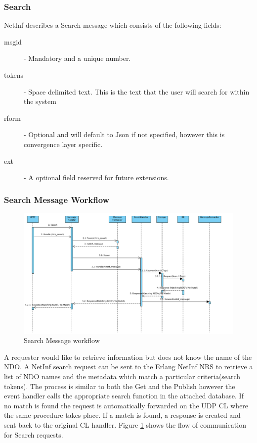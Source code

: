 \subsubsection{Search}

NetInf describes a Search message which consists of the following fields:

\begin{description}
\item[msgid] - Mandatory and a unique number.
\item[tokens] - Space delimited text. This is the text that the user will search for within the system
\item[rform] - Optional and will default to Json if not specified, however this is convergence layer specific.
\item[ext] - A optional field reserved for future extensions.
\end{description}

\subsubsection{Search Message Workflow}

\begin{figure}[H]
	\centering
\centerline{\includegraphics[width=1.2\textwidth]{./img/backend_seq_diagram_SEARCH.png}}
\caption{Search Message workflow}
\label{fig:searchfig}
\end{figure}

A requester would like to retrieve information but does not know the name of the NDO. A NetInf search request can be sent to the Erlang NetInf NRS to retrieve a list of NDO names and the metadata which match a particular criteria(search tokens). The process is similar to both the Get and the Publish however the event handler calls the appropriate search function in the attached database. If no match is found the request is automatically forwarded on the UDP CL where the same procedure takes place. If a match is found, a response is created  and sent back to the original CL handler. Figure \ref{fig:searchfig} shows the flow of communication for Search requests.
